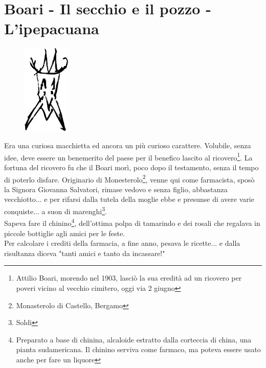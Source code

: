 
\chapter{Boari - Il secchio e il pozzo - L'ipepacuana}
\begin{figure}
  \vspace{-30pt}
  \begin{center}
    \includegraphics[width=0.2\textwidth]{Boari.jpg}
  \end{center}
  \vspace{-20pt}
\end{figure}
Era una curiosa macchietta ed ancora un più curioso carattere. Volubile, senza idee, deve essere un benemerito del paese per il benefico lascito al ricovero\footnote{Attilio Boari, morendo nel 1903, lasciò la sua eredità ad un ricovero per poveri vicino al vecchio cimitero, oggi via 2 giugno}. La fortuna del ricovero fu che il Boari morì, poco dopo il testamento, senza il tempo di poterlo disfare. Originario di Monesterolo\footnote{Monasterolo di Castello, Bergamo}, venne qui come farmacista, sposò la Signora Giovanna Salvatori, rimase vedovo e senza figlio, abbastanza vecchiotto... e per rifarsi dalla tutela della moglie ebbe e presunse di avere varie conquiste... a suon di marenghi\footnote{Soldi}.\\
Sapeva fare il chinino\footnote{Preparato a base di chinina, alcaloide estratto dalla corteccia di china, una pianta sudamericana. Il chinino serviva come farmaco, ma poteva essere usato anche per fare un liquore}, dell'ottima polpa di tamarindo e dei rosali che regalava in piccole bottiglie agli amici per le feste.\\
Per calcolare i crediti della farmacia, a fine anno, pesava le ricette... e dalla risultanza diceva "tanti amici e tanto da incassare!"\\
